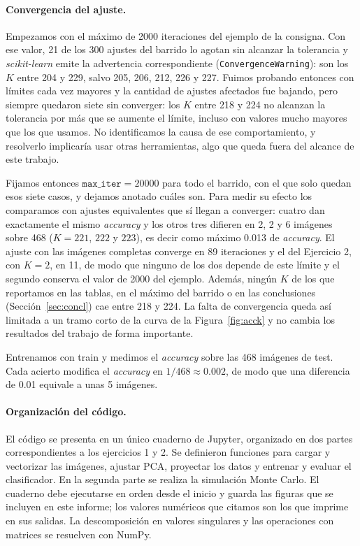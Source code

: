 \documentclass[11pt,a4paper]{article}
\newcommand{\acc}{\emph{accuracy}}
\begin{document}
\paragraph{Convergencia del ajuste.} Empezamos con el máximo de 2000 iteraciones del ejemplo de la
consigna. Con ese valor, 21 de los 300 ajustes del barrido lo agotan sin alcanzar la tolerancia y
\emph{scikit-learn} emite la advertencia correspondiente (\texttt{ConvergenceWarning}): son los $K$ entre
204 y 229, salvo 205, 206, 212, 226 y 227. Fuimos probando entonces con límites cada vez mayores y la
cantidad de ajustes afectados fue bajando, pero siempre quedaron siete sin converger: los $K$ entre 218 y
224 no alcanzan la tolerancia por más que se aumente el límite, incluso con valores mucho mayores que los
que usamos. No identificamos la causa de ese comportamiento, y resolverlo implicaría usar otras
herramientas, algo que queda fuera del alcance de este trabajo.

Fijamos entonces $\texttt{max\_iter}=20000$ para todo el barrido, con el que solo quedan esos siete casos,
y dejamos anotado cuáles son. Para medir su efecto los comparamos con ajustes equivalentes que sí
llegan a converger: cuatro dan exactamente el mismo \acc{} y los otros tres difieren en 2, 2 y 6 imágenes
sobre 468 ($K=221$, $222$ y $223$), es decir como máximo 0.013 de \acc{}. El ajuste con las imágenes
completas converge en 89 iteraciones y el del Ejercicio 2, con $K=2$, en 11, de modo que ninguno de los dos
depende de este límite y el segundo conserva el valor de 2000 del ejemplo. Además, ningún $K$ de los que
reportamos en las tablas, en el máximo del barrido o en las conclusiones (Sección~\ref{sec:concl}) cae
entre 218 y 224. La falta de convergencia queda así limitada a un tramo corto de la curva de la
Figura~\ref{fig:acck} y no cambia los resultados del trabajo de forma importante.

Entrenamos con train y medimos el \acc{} sobre las 468 imágenes de test. Cada acierto
modifica el \acc{} en $1/468\approx0.002$, de modo que una diferencia de 0.01 equivale a unas 5 imágenes.

\paragraph{Organización del código.} El código se presenta en un único cuaderno de Jupyter, organizado
en dos partes correspondientes a los ejercicios 1 y 2. Se definieron funciones para cargar y vectorizar
las imágenes, ajustar PCA, proyectar los datos y entrenar y evaluar el clasificador. En la segunda parte
se realiza la simulación Monte Carlo. El cuaderno debe ejecutarse en orden desde el inicio y guarda las
figuras que se incluyen en este informe; los valores numéricos que citamos son los que imprime en sus
salidas. La descomposición en valores singulares y las operaciones con matrices se resuelven con
NumPy.
\end{document}
